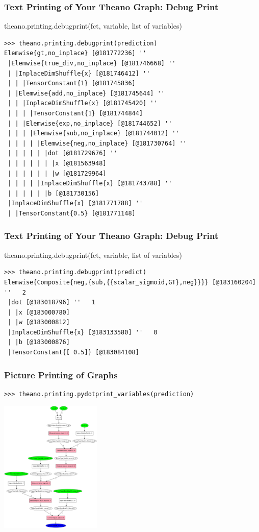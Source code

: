 \documentclass[a4paper,9pt]{beamer}
\begin{document}
\begin{frame}[fragile]
\frametitle{Text Printing of Your Theano Graph: Debug Print}
theano.printing.debugprint({fct, variable, list of variables})
\vfill
\small
\begin{Verbatim}
>>> theano.printing.debugprint(prediction)
Elemwise{gt,no_inplace} [@181772236] ''   
 |Elemwise{true_div,no_inplace} [@181746668] ''   
 | |InplaceDimShuffle{x} [@181746412] ''   
 | | |TensorConstant{1} [@181745836]
 | |Elemwise{add,no_inplace} [@181745644] ''   
 | | |InplaceDimShuffle{x} [@181745420] ''   
 | | | |TensorConstant{1} [@181744844]
 | | |Elemwise{exp,no_inplace} [@181744652] ''   
 | | | |Elemwise{sub,no_inplace} [@181744012] ''   
 | | | | |Elemwise{neg,no_inplace} [@181730764] ''   
 | | | | | |dot [@181729676] ''   
 | | | | | | |x [@181563948]
 | | | | | | |w [@181729964]
 | | | | |InplaceDimShuffle{x} [@181743788] ''   
 | | | | | |b [@181730156]
 |InplaceDimShuffle{x} [@181771788] ''   
 | |TensorConstant{0.5} [@181771148]
\end{Verbatim}
\end{frame}

\begin{frame}[fragile]
\frametitle{Text Printing of Your Theano Graph: Debug Print}
theano.printing.debugprint({fct, variable, list of variables})
\vfill
\small
\begin{Verbatim}
>>> theano.printing.debugprint(predict)
Elemwise{Composite{neg,{sub,{{scalar_sigmoid,GT},neg}}}} [@183160204] ''   2
 |dot [@183018796] ''   1
 | |x [@183000780]
 | |w [@183000812]
 |InplaceDimShuffle{x} [@183133580] ''   0
 | |b [@183000876]
 |TensorConstant{[ 0.5]} [@183084108]
\end{Verbatim}
\end{frame}

\begin{frame}[fragile]
\frametitle{Picture Printing of Graphs}
\begin{Verbatim}
>>> theano.printing.pydotprint_variables(prediction)
\end{Verbatim}
\includegraphics[width=1.9in]{pics/logreg_pydotprint_prediction.png}
\end{frame}
\end{document}
